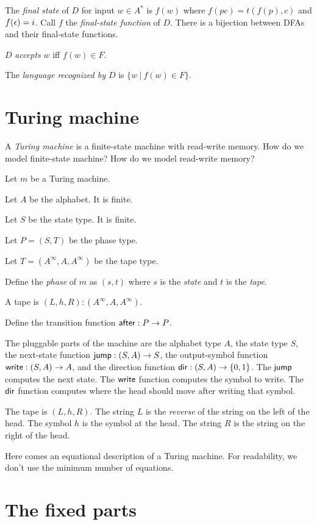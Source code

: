 The \emph{final state} of \(D\) for input \(w \in A^*\) is \(f(w)\)
where \(f(pc) = t(f(p), c)\) and \(f(\epsilon)=i\).
Call \(f\) the \emph{final-state function} of \(D\).
There is a bijection between DFAs and their final-state functions.

\(D\) \emph{accepts} \(w\) iff \(f(w) \in F\).

The \emph{language recognized by \(D\)} is \(\{ w ~|~ f(w) \in F \}\).

\section{Turing machine}

A \emph{Turing machine} is a finite-state machine with read-write memory.
How do we model finite-state machine?
How do we model read-write memory?

Let \(m\) be a Turing machine.

Let \(A\) be the alphabet.
It is finite.

Let \(S\) be the state type.
It is finite.

Let \(P = (S,T)\) be the phase type.

Let \(T = (A^\infty,A,A^\infty)\) be the tape type.

Define the \emph{phase} of \(m\) as \((s,t)\)
where \(s\) is the \emph{state} and \(t\) is the \emph{tape}.

A tape is \((L,h,R) : (A^\infty,A,A^\infty)\).

Define the transition function \(\textsf{after} : P \to P\).

The pluggable parts of the machine are
the alphabet type \(A\),
the state type \(S\),
the next-state function \(\textsf{jump} : (S,A) \to S\),
the output-symbol function \(\textsf{write} : (S,A) \to A\),
and the direction function \(\textsf{dir} : (S,A) \to \{0,1\}\).
The \(\textsf{jump}\) computes the next state.
The \(\textsf{write}\) function computes the symbol to write.
The \(\textsf{dir}\) function computes where the head should move after writing that symbol.

The tape is \((L,h,R)\).
The string \(L\) is the \emph{reverse} of the string on the left of the head.
The symbol \(h\) is the symbol at the head.
The string \(R\) is the string on the right of the head.

Here comes an equational description of a Turing machine.
For readability, we don't use the minimum number of equations.

\section{The fixed parts}

